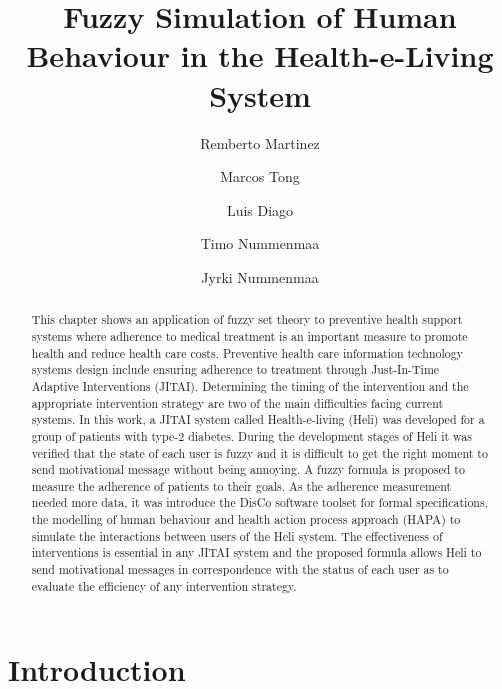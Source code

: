 \documentclass{llncs}
\begin{document}
\title{Fuzzy Simulation of Human Behaviour in the Health-e-Living System}

\author{Remberto Martinez \and Marcos Tong \and Luis Diago \and Timo Nummenmaa \and Jyrki Nummenmaa }


\maketitle
%
\begin{abstract}

This chapter shows an application of fuzzy set theory to preventive health support systems where adherence to medical treatment is an important measure to promote health and reduce health care costs. Preventive health care information technology systems design include ensuring adherence to treatment through Just-In-Time Adaptive Interventions (JITAI). Determining the timing of the intervention and the appropriate intervention strategy are two of the main difficulties facing current systems. In this work, a JITAI system called Health-e-living (Heli) was developed for a group of patients with type-2 diabetes. During the development stages of Heli it was verified that the state of each user is fuzzy and it is difficult to get the right moment to send motivational message without being annoying. A fuzzy formula is proposed to measure the adherence of patients to their goals. 
As the adherence measurement needed more data, it was introduce the DisCo software toolset for formal specifications, the modelling of human behaviour and health action process approach (HAPA) to simulate the interactions between users of the Heli system. The effectiveness of interventions is essential in any JITAI system and the proposed formula allows Heli to send motivational messages in correspondence with the status of each user as to evaluate the efficiency of any intervention strategy.

\end{abstract}



\section{Introduction}
\end{document}
